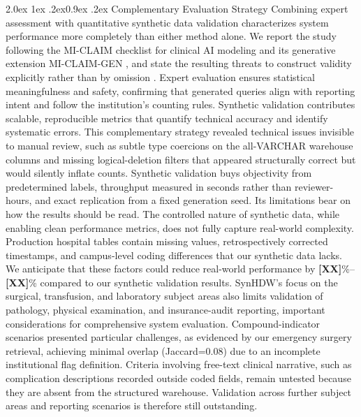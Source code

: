 \documentclass[10pt,twocolumn]{article}
\makeatletter
\renewcommand\subsection{\@startsection{subsection}{2}{\z@}%
  {2.0ex \@plus 1ex \@minus .2ex}{0.9ex \@plus .2ex}%
  {\normalfont\normalsize\bfseries}}
\newcommand{\PH}[1]{{\color{red}\textbf{[#1]}}}
\makeatother
\begin{document}
\subsection{Complementary Evaluation Strategy}
Combining expert assessment with quantitative synthetic data validation characterizes system performance more completely than either method alone. We report the study following the MI-CLAIM checklist for clinical AI modeling and its generative extension MI-CLAIM-GEN \cite{miclaim2020,miclaimgen2024}, and state the resulting threats to construct validity explicitly rather than by omission \cite{validity2023}.
Expert evaluation
ensures statistical meaningfulness and safety, confirming that generated queries
align with reporting intent and follow the institution's counting rules.
Synthetic validation contributes scalable, reproducible metrics that quantify
technical accuracy and identify systematic errors. This complementary strategy
revealed technical issues invisible to manual review, such as subtle type
coercions on the all-VARCHAR warehouse columns and missing logical-deletion
filters that appeared structurally correct but would silently inflate counts.
Synthetic validation buys objectivity from predetermined labels, throughput measured in seconds rather than reviewer-hours, and exact replication from a fixed generation seed. Its limitations bear on how the results should be read. The controlled nature of synthetic data, while enabling
clean performance metrics, does not fully capture real-world complexity.
Production hospital tables contain missing values, retrospectively corrected
timestamps, and campus-level coding differences that our synthetic data lacks.
We anticipate that these factors could reduce real-world performance by
\PH{XX}\%--\PH{XX}\% compared to our synthetic validation results. SynHDW's
focus on the surgical, transfusion, and laboratory subject areas also limits
validation of pathology, physical examination, and insurance-audit reporting,
important considerations for comprehensive system evaluation. Compound-indicator
scenarios presented particular challenges, as evidenced by our emergency surgery
retrieval, achieving minimal overlap (Jaccard=0.08) due to an incomplete
institutional flag definition. Criteria involving free-text clinical narrative,
such as complication descriptions recorded outside coded fields, remain untested
because they are absent from the structured warehouse. Validation across further subject areas and reporting scenarios is therefore still outstanding.
\end{document}
